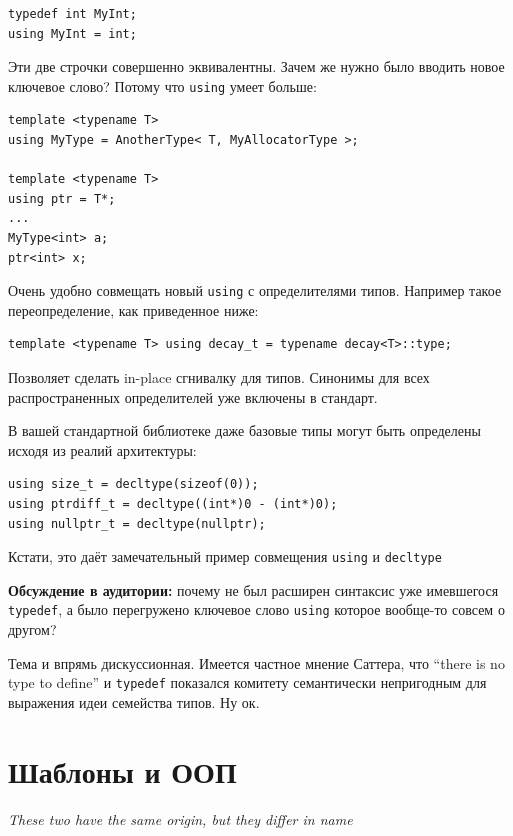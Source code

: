 \documentclass[a4paper,12pt,oneside]{book}
\begin{document}
\begin{lstlisting}
typedef int MyInt;
using MyInt = int;
\end{lstlisting}

Эти две строчки совершенно эквивалентны. Зачем же нужно было вводить новое ключевое слово? Потому что \lstinline!using! умеет больше:

\begin{lstlisting}
template <typename T> 
using MyType = AnotherType< T, MyAllocatorType >; 

template <typename T> 
using ptr = T*;
...
MyType<int> a;
ptr<int> x;
\end{lstlisting}

Очень удобно совмещать новый \lstinline!using! с определителями типов. Например такое переопределение, как приведенное ниже:

\begin{lstlisting}
template <typename T> using decay_t = typename decay<T>::type;
\end{lstlisting}

Позволяет сделать in-place сгнивалку для типов. Синонимы для всех распространенных определителей уже включены в стандарт.

В вашей стандартной библиотеке даже базовые типы могут быть определены исходя из реалий архитектуры:

\begin{lstlisting}
using size_t = decltype(sizeof(0));
using ptrdiff_t = decltype((int*)0 - (int*)0);
using nullptr_t = decltype(nullptr);
\end{lstlisting}

Кстати, это даёт замечательный пример совмещения \lstinline!using! и \lstinline!decltype!

\textbf{Обсуждение в аудитории:} почему не был расширен синтаксис уже имевшегося \lstinline!typedef!, а было перегружено ключевое слово \lstinline!using! которое вообще-то совсем о другом?

Тема и впрямь дискуссионная. Имеется частное мнение Саттера, что ``there is no type to define'' и \lstinline!typedef! показался комитету семантически непригодным для выражения идеи семейства типов. Ну ок.

\pagebreak
\section{Шаблоны и ООП}\label{OOTemplates}

\hfill\textit{These two have the same origin, but they differ in name}
\end{document}
